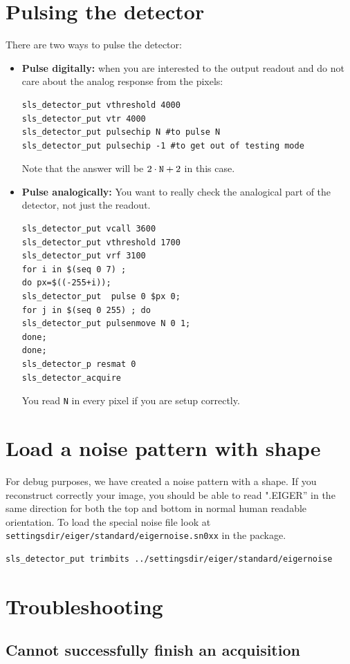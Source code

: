 \documentclass{article}
\begin{document}
\section{Pulsing the detector}
There are two ways to pulse the detector: 
\begin{itemize}
\item \textbf{Pulse digitally:} when you are interested to the output readout and do not care about the analog response from the pixels:
 \begin{verbatim}
sls_detector_put vthreshold 4000
sls_detector_put vtr 4000
sls_detector_put pulsechip N #to pulse N
sls_detector_put pulsechip -1 #to get out of testing mode 
\end{verbatim}
Note that the answer will be $2 \cdot \textrm{{\tt{N}}} +2$ in this case.

\item  \textbf{Pulse analogically:} You want to really check the analogical part of the detector, not just the readout.

 \begin{verbatim}
sls_detector_put vcall 3600
sls_detector_put vthreshold 1700
sls_detector_put vrf 3100
for i in $(seq 0 7) ; 
do px=$((-255+i)); 
sls_detector_put  pulse 0 $px 0;
for j in $(seq 0 255) ; do
sls_detector_put pulsenmove N 0 1;
done;
done;
sls_detector_p resmat 0
sls_detector_acquire
\end{verbatim}
You read {\tt{N}} in every pixel if you are setup correctly. 
\end{itemize}
 
\section{Load a noise pattern with shape}
For debug purposes, we have created a noise pattern with a shape. If you reconstruct correctly your image, you should be able to read ".EIGER'' in the same direction for both the top and bottom in normal human readable orientation.
To load the special noise file look at {\tt{settingsdir/eiger/standard/eigernoise.sn0xx}} in the package. 
\begin{verbatim}
sls_detector_put trimbits ../settingsdir/eiger/standard/eigernoise
\end{verbatim}

\section{Troubleshooting}
\subsection{Cannot successfully finish an acquisition}
\end{document}
